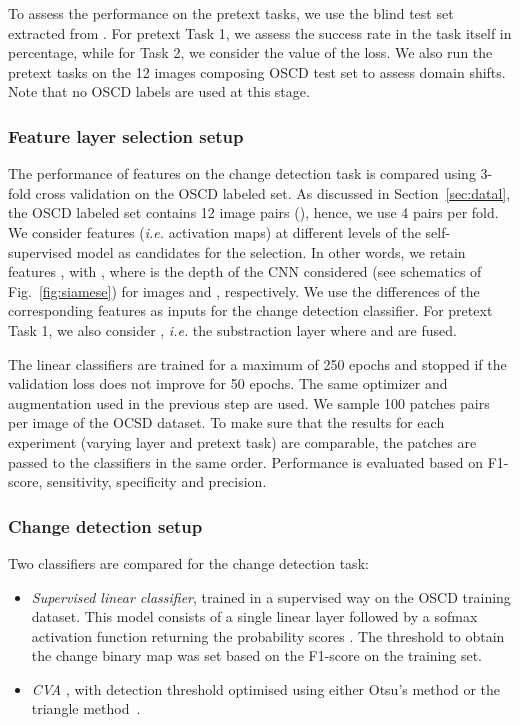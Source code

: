 \documentclass[runningheads]{llncs}
\begin{document}
\vspace{0.2cm}

To assess the performance on the pretext tasks, we use the blind test set extracted from . For pretext Task 1, we assess the success rate in the task itself in percentage, while for Task 2, we consider the value of the loss. We also run the pretext tasks on the {12} images composing OSCD test set {to assess domain shifts}. Note that no OSCD labels are used at this stage.


\subsubsection{Feature layer selection setup} 
The performance of features  on the change detection task is compared using 3-fold cross validation on the OSCD labeled set. As discussed in Section~\ref{sec:datal}, the OSCD labeled set contains 12 image pairs (), hence, we use 4 pairs per fold. We consider features (\emph{i.e.} activation maps) at different levels of the self-supervised model as candidates for the selection. In other words, we retain features , with , where  is the depth of the CNN considered (see schematics of Fig.~\ref{fig:siamese}) for images  and , respectively. We use the differences of the corresponding features as inputs for the change detection classifier. For pretext Task 1, we also consider , \emph{i.e.} the substraction layer where  and  are fused.

{The linear classifiers} are trained for a maximum of 250 epochs and stopped if the validation loss does not improve for 50 epochs. The same optimizer and augmentation used in the previous step are used.
We sample 100 patches pairs per image of the OCSD dataset. 
To make sure that the results for each experiment (varying layer and pretext task) are comparable, the patches are passed to the classifiers in the same order. Performance is evaluated based on F1-score, sensitivity, specificity and precision. 

\subsubsection{Change detection setup} 
Two classifiers are compared for the change detection task: 
\begin{itemize}
    \item \textit{Supervised linear classifier}, trained in a supervised way on the OSCD training dataset.   {This model consists of a single linear layer followed by a sofmax activation function returning the probability scores . The threshold to obtain the change binary map was set based on the F1-score on the training set.}
    
     \item \textit{CVA} \cite{Bruzzone:2013:cd_framework}, with detection threshold optimised using either Otsu's method or the triangle method~\cite{Rosin:2001:triangle}.
      
\end{itemize}
\end{document}
